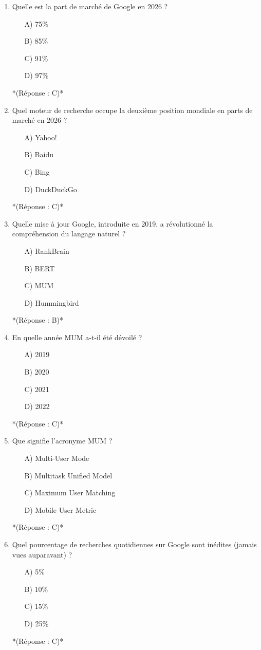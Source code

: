\documentclass[12pt,a4paper,twoside]{report}
\begin{document}
\begin{enumerate}
\item Quelle est la part de marché de Google en 2026 ?
\begin{itemize}
\item[A)] 75\%
\item[B)] 85\%
\item[C)] 91\%
\item[D)] 97\%
\end{itemize}
*(Réponse : C)*

\item Quel moteur de recherche occupe la deuxième position mondiale en parts de marché en 2026 ?
\begin{itemize}
\item[A)] Yahoo!
\item[B)] Baidu
\item[C)] Bing
\item[D)] DuckDuckGo
\end{itemize}
*(Réponse : C)*

\item Quelle mise à jour Google, introduite en 2019, a révolutionné la compréhension du langage naturel ?
\begin{itemize}
\item[A)] RankBrain
\item[B)] BERT
\item[C)] MUM
\item[D)] Hummingbird
\end{itemize}
*(Réponse : B)*

\item En quelle année MUM a-t-il été dévoilé ?
\begin{itemize}
\item[A)] 2019
\item[B)] 2020
\item[C)] 2021
\item[D)] 2022
\end{itemize}
*(Réponse : C)*

\item Que signifie l'acronyme MUM ?
\begin{itemize}
\item[A)] Multi-User Mode
\item[B)] Multitask Unified Model
\item[C)] Maximum User Matching
\item[D)] Mobile User Metric
\end{itemize}
*(Réponse : C)*

\item Quel pourcentage de recherches quotidiennes sur Google sont inédites (jamais vues auparavant) ?
\begin{itemize}
\item[A)] 5\%
\item[B)] 10\%
\item[C)] 15\%
\item[D)] 25\%
\end{itemize}
*(Réponse : C)*


\end{enumerate}
\end{document}
